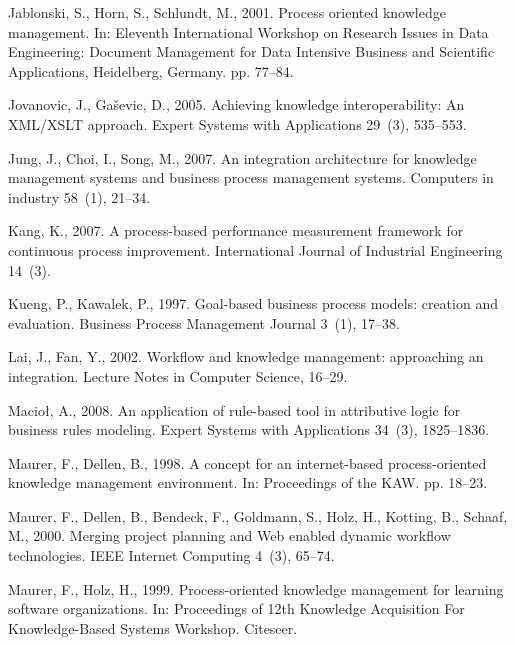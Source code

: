 \documentclass{elsarticle}
\begin{document}
{\begin{thebibliography}{37}
Jablonski, S., Horn, S., Schlundt, M., 2001. {Process oriented knowledge
  management}. In: Eleventh International Workshop on Research Issues in Data
  Engineering: Document Management for Data Intensive Business and Scientific
  Applications, Heidelberg, Germany. pp. 77--84.

Jovanovic, J., Ga{\v{s}}evic, D., 2005. {Achieving knowledge interoperability:
  An XML/XSLT approach}. Expert Systems with Applications 29~(3), 535--553.

Jung, J., Choi, I., Song, M., 2007. {An integration architecture for knowledge
  management systems and business process management systems}. Computers in
  industry 58~(1), 21--34.

Kang, K., 2007. {A process-based performance measurement framework for
  continuous process improvement}. International Journal of Industrial
  Engineering 14~(3).

Kueng, P., Kawalek, P., 1997. {Goal-based business process models: creation and
  evaluation}. Business Process Management Journal 3~(1), 17--38.

Lai, J., Fan, Y., 2002. {Workflow and knowledge management: approaching an
  integration}. Lecture Notes in Computer Science, 16--29.

Macio{\l}, A., 2008. {An application of rule-based tool in attributive logic
  for business rules modeling}. Expert Systems with Applications 34~(3),
  1825--1836.

Maurer, F., Dellen, B., 1998. {A concept for an internet-based process-oriented
  knowledge management environment}. In: Proceedings of the KAW. pp. 18--23.

Maurer, F., Dellen, B., Bendeck, F., Goldmann, S., Holz, H., Kotting, B.,
  Schaaf, M., 2000. {Merging project planning and Web enabled dynamic workflow
  technologies}. IEEE Internet Computing 4~(3), 65--74.

Maurer, F., Holz, H., 1999. {Process-oriented knowledge management for learning
  software organizations}. In: Proceedings of 12th Knowledge Acquisition For
  Knowledge-Based Systems Workshop. Citeseer.


\end{thebibliography}}
\end{document}
